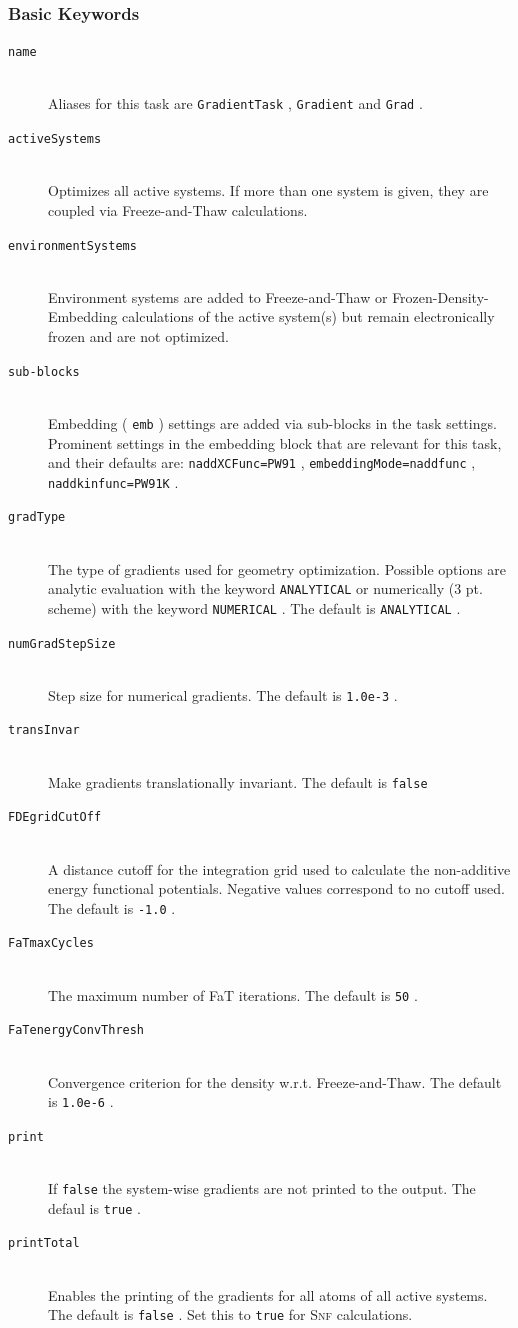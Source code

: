 \documentclass[bibliography=totocnumbered,a4paper,10pt,oneside]{scrbook}
\newcommand{\ttt}[1]{%
  \begingroup\setlength{\fboxsep}{1pt}%
  \colorbox{serenity-green!30}{\texttt{\hspace*{2pt}\vphantom{(g}#1\hspace*{2pt}}}%
  \endgroup
}
\begin{document}
\subsubsection{Basic Keywords}
\begin{description}
\item [\texttt{name}]\hfill \\
 Aliases for this task are \ttt{GradientTask} , \ttt{Gradient} and \ttt{Grad}.
\item [\texttt{activeSystems}]\hfill \\
 Optimizes all active systems. If more than one system is given, they are coupled via Freeze-and-Thaw calculations.
\item [\texttt{environmentSystems}]\hfill \\
 Environment systems are added to Freeze-and-Thaw or Frozen-Density-Embedding calculations of the active system(s) but remain electronically frozen and are not optimized.
\item [\texttt{sub-blocks}]\hfill \\
 Embedding (\ttt{emb}) settings are added via sub-blocks in the task settings.
 Prominent settings in the embedding block that are relevant for this task, and their defaults are:
 \ttt{naddXCFunc=PW91}, \ttt{embeddingMode=naddfunc}, \ttt{naddkinfunc=PW91K}.
\item [\texttt{gradType}]\hfill \\
 The type of gradients used for geometry optimization. Possible options are analytic evaluation with the keyword \ttt{ANALYTICAL} or numerically (3 pt. scheme) with the keyword \ttt{NUMERICAL}. The default is \ttt{ANALYTICAL}.
\item [\texttt{numGradStepSize}]\hfill \\
 Step size for numerical gradients. The default is \ttt{1.0e-3}. 
\item [\texttt{transInvar}]\hfill \\
  Make gradients translationally invariant. The default is \ttt{false}
\item [\texttt{FDEgridCutOff}]\hfill \\
  A distance cutoff for the integration grid used to calculate the non-additive energy functional potentials. Negative values correspond to no cutoff used. The default is \ttt{-1.0}.
\item [\texttt{FaTmaxCycles}]\hfill \\
  The maximum number of FaT iterations. The default is \ttt{50}.
\item [\texttt{FaTenergyConvThresh}]\hfill \\
  Convergence criterion for the density w.r.t. Freeze-and-Thaw. The default is \ttt{1.0e-6}.
\item [\texttt{print}]\hfill \\
  If \ttt{false} the system-wise gradients are not printed to the output. The defaul is \ttt{true}.
\item [\texttt{printTotal}]\hfill \\
  Enables the printing of the gradients for all atoms of all active systems. The default is \ttt{false}.
  Set this to \ttt{true} for \textsc{Snf} calculations.
\end{description}
\end{document}

